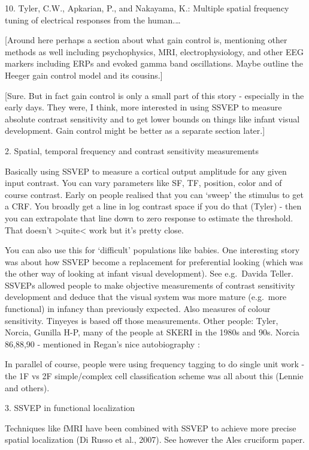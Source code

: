 \documentclass[
  letterpaper,
  DIV=11,
  numbers=noendperiod]{scrartcl}
\begin{document}
10. Tyler, C.W., Apkarian, P., and Nakayama, K.: Multiple spatial
frequency tuning of electrical responses from the human.\ldots{}

{[}Around here perhaps a section about what gain control is, mentioning
other methods as well including psychophysics, MRI, electrophysiology,
and other EEG markers including ERPs and evoked gamma band oscillations.
Maybe outline the Heeger gain control model and its cousins.{]}

{[}Sure. But in fact gain control is only a small part of this story -
especially in the early days. They were, I think, more interested in
using SSVEP to measure absolute contrast sensitivity and to get lower
bounds on things like infant visual development. Gain control might be
better as a separate section later.{]}

\label{anchor-4}{}2. Spatial, temporal frequency and
contrast sensitivity measurements

Basically using SSVEP to measure a cortical output amplitude for any
given input contrast. You can vary parameters like SF, TF, position,
color and of course contrast. Early on people realised that you can
`sweep' the stimulus to get a CRF. You broadly get a line in log
contrast space if you do that (Tyler) - then you can extrapolate that
line down to zero response to estimate the threshold. That doesn't
\textgreater quite\textless{} work but it's pretty close.

You can also use this for `difficult' populations like babies. One
interesting story was about how SSVEP become a replacement for
preferential looking (which was the other way of looking at infant
visual development). See e.g.~Davida Teller. SSVEPs allowed people to
make objective measurements of contrast sensitivity development and
deduce that the visual system was more mature (e.g.~more functional) in
infancy than previously expected. Also measures of colour sensitivity.
Tinyeyes is based off those measurements. Other people: Tyler, Norcia,
Gunilla H-P, many of the people at SKERI in the 1980s and 90s. Norcia
86,88,90 - mentioned in Regan's nice autobiography :

In parallel of course, people were using frequency tagging to do single
unit work - the 1F vs 2F simple/complex cell classification scheme was
all about this (Lennie and others).

\label{anchor-5}{}3. SSVEP in functional localization

Techniques like fMRI have been combined with SSVEP to achieve more
precise spatial localization (Di Russo et al., 2007). See however the
Ales cruciform paper.
\end{document}
